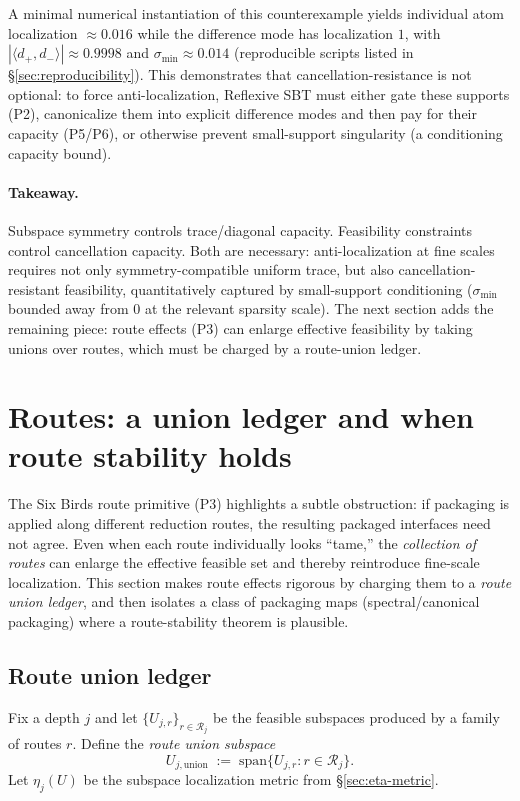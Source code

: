\documentclass[11pt]{article}
\theoremstyle{plain}
\theoremstyle{definition}
\theoremstyle{remark}
\begin{document}
A minimal numerical instantiation of this counterexample yields individual atom localization \(\approx 0.016\) while the difference mode has localization \(1\), with \(|\langle d_+,d_-\rangle|\approx 0.9998\) and \(\sigma_{\min}\approx 0.014\) (reproducible scripts listed in \S\ref{sec:reproducibility}).
This demonstrates that cancellation-resistance is not optional: to force anti-localization, Reflexive SBT must either gate these supports (P2), canonicalize them into explicit difference modes and then pay for their capacity (P5/P6), or otherwise prevent small-support singularity (a conditioning capacity bound).

\paragraph{Takeaway.}
Subspace symmetry controls trace/diagonal capacity.
Feasibility constraints control cancellation capacity.
Both are necessary: anti-localization at fine scales requires not only symmetry-compatible uniform trace, but also cancellation-resistant feasibility, quantitatively captured by small-support conditioning (\(\sigma_{\min}\) bounded away from \(0\) at the relevant sparsity scale).
The next section adds the remaining piece: route effects (P3) can enlarge effective feasibility by taking unions over routes, which must be charged by a route-union ledger.
 \section{Routes: a union ledger and when route stability holds}\label{sec:routes-union-ledger}

The Six Birds route primitive (P3) highlights a subtle obstruction: if packaging is applied along different reduction routes, the resulting packaged interfaces need not agree.
Even when each route individually looks ``tame,'' the \emph{collection of routes} can enlarge the effective feasible set and thereby reintroduce fine-scale localization.
This section makes route effects rigorous by charging them to a \emph{route union ledger}, and then isolates a class of packaging maps (spectral/canonical packaging) where a route-stability theorem is plausible.

\subsection{Route union ledger}\label{subsec:route_union_ledger}

Fix a depth \(j\) and let \(\{U_{j,r}\}_{r\in\mathcal{R}_j}\) be the feasible subspaces produced by a family of routes \(r\).
Define the \emph{route union subspace}
\begin{equation}\label{eq:U_union_def}
U_{j,\mathrm{union}} \;:=\; \mathrm{span}\{U_{j,r} : r\in\mathcal{R}_j\}.
\end{equation}
Let \(\eta_j(U)\) be the subspace localization metric from \S\ref{sec:eta-metric}.
\end{document}
